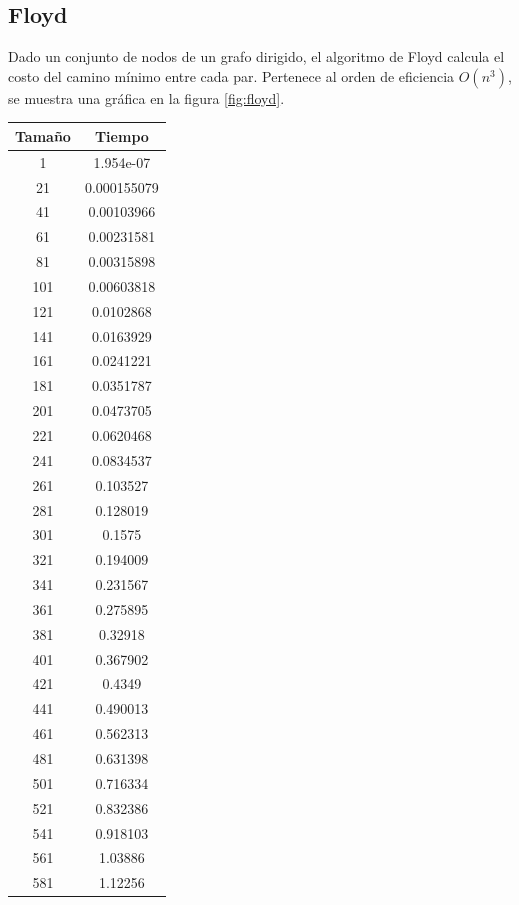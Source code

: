 \documentclass{article}
\begin{document}
\subsection{Floyd}
Dado un conjunto de nodos de un grafo dirigido, el algoritmo de Floyd calcula el costo del camino mínimo entre cada par. Pertenece al orden de eficiencia $O(n ^3)$, se muestra una gráfica en la figura \ref{fig:floyd}.
\begin{longtable}{|c||c|}
	\hline
	Tamaño & Tiempo  \\ \hline
	1       & 1.954e-07    \\ \hline
	21      & 0.000155079 \\ \hline
	41      & 0.00103966 \\ \hline
	61      & 0.00231581 \\ \hline
	81      & 0.00315898 \\ \hline
	101     & 0.00603818 \\ \hline
	121     & 0.0102868 \\ \hline
	141     & 0.0163929 \\ \hline
	161     & 0.0241221 \\ \hline
	181     & 0.0351787 \\ \hline
	201     & 0.0473705 \\ \hline
	221     & 0.0620468 \\ \hline
	241     & 0.0834537 \\ \hline
	261     & 0.103527 \\ \hline
	281     & 0.128019 \\ \hline
	301     & 0.1575 \\ \hline
	321     & 0.194009 \\ \hline
	341     & 0.231567 \\ \hline
	361     & 0.275895 \\ \hline
	381     & 0.32918 \\ \hline
	401     & 0.367902 \\ \hline
	421     & 0.4349 \\ \hline
	441     & 0.490013 \\ \hline
	461     & 0.562313 \\ \hline
	481     & 0.631398 \\ \hline
	501     & 0.716334 \\ \hline
	521     & 0.832386 \\ \hline
	541     & 0.918103 \\ \hline
	561     & 1.03886 \\ \hline
	581     & 1.12256 \\ \hline

\end{longtable}
\end{document}

